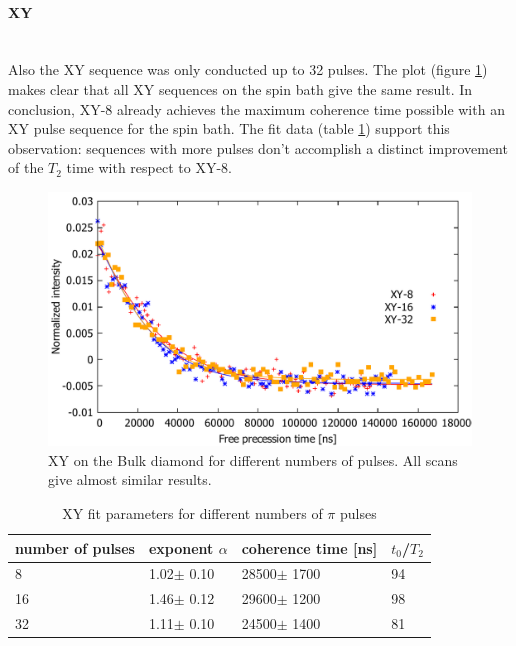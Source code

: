 \documentclass[12pt,a4paper]{article}
\begin{document}
\paragraph{XY}\mbox{}\\
Also the XY sequence was only conducted up to 32 pulses. The plot (figure \ref{xb}) makes clear that all XY sequences on the spin bath give the same result. In conclusion, XY-8 already achieves the maximum coherence time possible with an XY pulse sequence for the spin bath. The fit data (table \ref{x4b}) support this observation: sequences with more pulses don't accomplish a distinct improvement of the $T_2$ time with respect to XY-8.
\begin{figure}[H]
\includegraphics[scale=0.6]{xybulk.pdf} 
\caption{XY on the Bulk diamond for different numbers of pulses. All scans give almost similar results.}
\label{xb}
\end{figure}
\begin{table}[H]
\centering
\caption{XY fit parameters for different numbers of $\pi$ pulses}
\label{x4b}
\begin{tabular}{l|lll}
number of pulses &   exponent $\alpha$   & coherence time {[}ns{]}   & $t_0$/$T_2$   \\\hline
8                &   1.02$\pm$ 0.10      & 28500$\pm$ 1700                    & 94\\
16               &   1.46$\pm$ 0.12      & 29600$\pm$ 1200                     & 98 \\
32               &   1.11$\pm$ 0.10      & 24500$\pm$ 1400                     & 81
\end{tabular}
\end{table}
\end{document}
